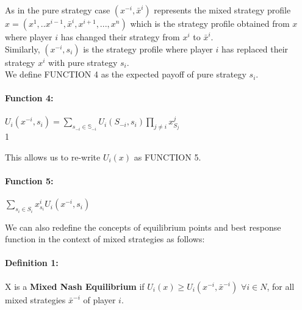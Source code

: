 \documentclass[12pt]{article}
\begin{document}
As in the pure strategy case $(x^{-i}, \bar{x}^i)$ represents the mixed strategy profile $x = (x^1, .. x^{i-1}, \bar{x}^i, x^{i+1}, ... ,x^n)$ which is the strategy profile obtained from $x$ where player $i$ has changed their strategy from $x^i$ to $\bar{x}^i$.\\

Similarly, $(x^{-i}, s_i)$ is the strategy profile where player $i$ has replaced their strategy $x^i$ with pure strategy $s_i$.\\

We define FUNCTION 4 as the expected payoff of pure strategy $s_i$.

\paragraph{Function 4:} $U_i(x^{-i},s_i) = \sum\limits_{s_{-i} \in \mathbb{S}_{-i}} U_i(S_{-i}, s_i) \prod\limits_{j \neq i} x^j_{S_j}$\\1

This allows us to re-write $U_i(x)$ as FUNCTION 5.

\paragraph{Function 5:} $\sum\limits_{s_i \in S_i} x^i_{s_i} U_i(x^{-i},s_i)$

We can also redefine the concepts of equilibrium points and best response function in the context of mixed strategies as follows:

\paragraph{Definition 1:} X is a \textbf{Mixed Nash Equilibrium} if $U_i(x) \geq U_i(x^{-i},\bar{x}^{-i})$ $\forall i \in N$, for all mixed strategies $\bar{x}^{-i}$ of player $i$.
\end{document}
